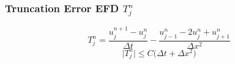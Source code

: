     \subsubsection{Truncation Error EFD \texorpdfstring{\hfill $T_j^n$}{Tjn}}
        \vspace{-0.5em}
        $$
            T_j^n = \frac{u_{j}^{n+1} - u_{j}^{n}}{\Delta t} - \frac{u_{j-1}^{n} - 2 u_{j}^{n} + u_{j+1}^{n}}{\Delta x ^2}
        $$
        $$\boxed{
            \lvert T_j^n \rvert \leq C \big(\Delta t + \Delta x^2\big)
        }$$
        

